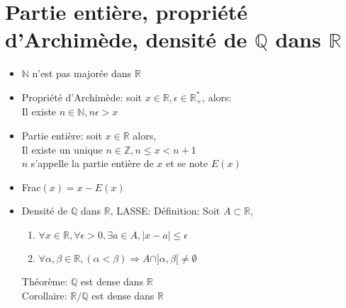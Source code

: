 \documentclass[fleqn]{article}
\begin{document}
\section{Partie entière, propri\'et\'e d'Archim\`ede, densit\'e de $\mathbb{Q}$ dans $\mathbb{R}$}
\begin{itemize}
	\item $\mathbb{N}$ n'est pas major\'ee dans $\mathbb{R}$
	\item Propri\'et\'e d'Archim\`ede: soit $x \in \mathbb{R}, \epsilon \in \mathbb{R}_+^*$, alors: \\
		Il existe $n \in \mathbb{N}, n\epsilon>x$
	\item Partie enti\`ere: soit $x \in \mathbb{R}$ alors, \\
		Il existe un unique $n \in \mathbb{Z}, n \leq x < n+1$ \\
		$n$ s'appelle la partie enti\`ere de $x$ et se note $E(x)$
	\item Frac$(x) = x - E(x)$
	\item Densit\'e de $\mathbb{Q}$ dans $\mathbb{R}$, LASSE:
		D\'efinition: Soit $A \subset \mathbb{R}$,
		\begin{enumerate}
			\item $\forall x \in \mathbb{R}, \forall \epsilon > 0, \exists a \in A, |x-a| \leq \epsilon$
			\item $\forall \alpha,\beta \in \mathbb{R}, (\alpha < \beta) \Rightarrow A \cap ]\alpha, \beta[ \neq \emptyset$
		\end{enumerate}
		Th\'eor\`eme: $\mathbb{Q}$ est dense dans $\mathbb{R}$ \\
		Corollaire: $\mathbb{R}/\mathbb{Q}$ est dense dans $\mathbb{R}$
\end{itemize}
\end{document}
